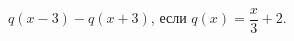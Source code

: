 \begin{ex}[type=calculate_expression]
	\begin{condition}
		\( q(x-3)-q(x+3) \), если \( q(x)=\dfrac{x}{3}+2 \).
	\end{condition}
\end{ex}